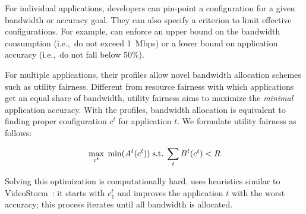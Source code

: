 For individual applications, developers can pin-point a configuration for a
given bandwidth or accuracy goal. They can also specify a criterion to limit
effective configurations. For example, \sysname{} can enforce an upper bound on
the bandwidth consumption (i.e.,~do not exceed \SI{1}{Mbps}) or a lower bound on
application accuracy (i.e.,~do not fall below 50\%).

For multiple applications, their profiles allow novel bandwidth allocation
schemes such as utility fairness. Different from resource fairness with which
applications get an equal share of bandwidth, utility fairness aims to maximize
the \textit{minimal} application accuracy. With the profiles, bandwidth
allocation is equivalent to finding proper configuration $c^t$ for application
$t$. We formulate utility fairness as follows:


\vspace{-0.5em}
\begin{equation}
  \vspace{-0.5em}
  \label{eq:multitask}
 \underset{c^t}{\max} \; \min({A^t(c^t)})
 \;
 \text{s.t.}
 \;
 \sum_t{B^t(c^t)} < R
\end{equation}


Solving this optimization is computationally hard. \sysname{} uses heuristics
similar to VideoStorm~\cite{zhang2017live}: it starts with $c^t_1$ and improves
the application $t$ with the worst accuracy; this process iterates until all
bandwidth is allocated.


